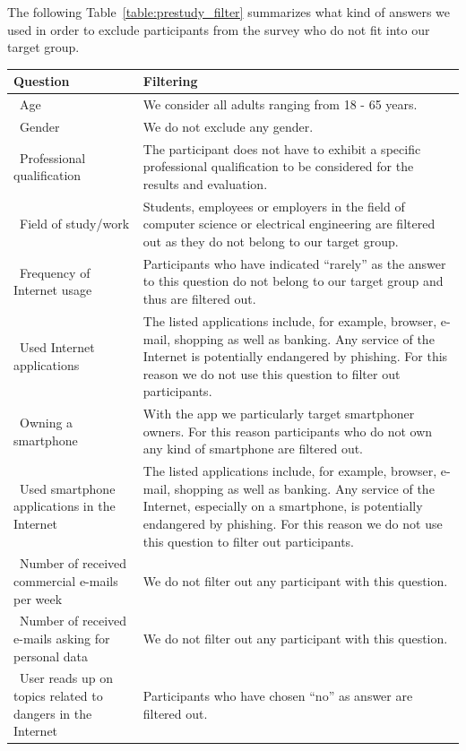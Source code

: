 The following Table~\ref{table:prestudy_filter} summarizes what kind of answers we used in order to exclude participants from the survey who do not fit into our target group.
\begin{table}[hHtbp]
\centering
    \begin{tabular}{ | p{5cm} | p{10cm} |}
    \hline\textbf{Question} & \textbf{Filtering}  \\  \hline
		\hline\  Age & We consider all adults ranging from 18 - 65 years.
 \\
    \hline\  Gender & We do not exclude any gender.
 \\ 
    \hline\  Professional qualification & The participant does not have to exhibit a specific professional qualification to be considered for the results and evaluation.
 \\ 
		\hline\  Field of study/work & Students, employees or employers in the field of computer science or electrical engineering are filtered out as they do not belong to our target group.
 \\ 
	  \hline\ Frequency of Internet usage & Participants who have indicated ``rarely'' as the answer to this question do not belong to our target group and thus are filtered out.
 \\ 
	  \hline\ Used Internet applications  &  The listed applications include, for example, browser, e-mail, shopping as well as banking.
 Any service of the Internet is potentially endangered by phishing.
 For this reason we do not use this question to filter out participants.
\\ 
    \hline\ Owning a smartphone  & With the app we particularly target smartphoner owners.
 For this reason participants who do not own any kind of smartphone are filtered out.
 \\
		\hline\ Used smartphone applications in the Internet  & The listed applications include, for example, browser, e-mail, shopping as well as banking.
 Any service of the Internet, especially on a smartphone, is potentially endangered by phishing.
 For this reason we do not use this question to filter out participants.
 \\
    \hline\ Number of received commercial e-mails per week  & We do not filter out any participant with this question.
 \\
    \hline\ Number of received e-mails asking for personal data  & We do not filter out any participant with this question.
 \\
    \hline\ User reads up on topics related to dangers in the Internet  &  Participants who have chosen ``no'' as answer are filtered out.

\end{tabular}
\end{table}
